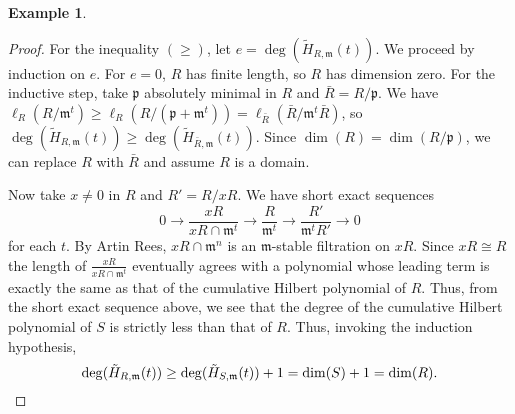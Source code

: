 \documentclass{amsart}[12pt]
\newcommand{\p}{{\mathfrak p}}
\newcommand{\m}{{\mathfrak m}}
\numberwithin{equation}{section}
\theoremstyle{plain} %
\theoremstyle{definition}
\newtheorem{definition}[equation]{Definition}
\newtheorem{ex}[equation]{Example}
\theoremstyle{remark}
\begin{document}
\begin{ex}
\begin{proof}
For the inequality $(\geq)$, let $e=\deg(\tilde{H}_{R,\m}(t))$. We proceed by induction on $e$. For $e=0$, $R$ has finite length, so $R$ has dimension zero. For the inductive step, take $\p$ absolutely minimal in $R$ and $\bar{R}=R/\p$. We have $\ell_R(R/\m^t) \geq \ell_R(R/(\p+\m^t))=\ell_{\bar{R}}(\bar{R}/\m^t \bar{R})$, so $\deg(\tilde{H}_{R,\m}(t)) \geq \deg(\tilde{H}_{\bar{R},\m}(t))$. Since $\dim(R)=\dim(R/\p)$, we can replace $R$ with $\bar{R}$ and assume $R$ is a domain.

Now take $x\neq 0$ in $R$ and $R'=R/xR$. We have short exact sequences
\[ 0 \to \frac{xR}{xR \cap \m^t} \to \frac{R}{\m^t } \to \frac{R'}{\m^t R'} \to  0\]
for each $t$. By Artin Rees, $xR \cap \m^n$ is an $\m$-stable filtration on $xR$. Since $xR\cong R$ the length of $\displaystyle \frac{xR}{xR \cap \m^t}$ eventually agrees with a polynomial whose leading term is exactly the same as that of the cumulative Hilbert polynomial of $R$. Thus, from the short exact sequence above, we see that the degree of the cumulative Hilbert polynomial of $S$ is strictly less than that of $R$. Thus, invoking the induction hypothesis,
\[  \deg(\tilde{H}_{R,\m}(t)) \geq \deg(\tilde{H}_{S,\m}(t)) +1 = \dim(S) +1 = \dim(R).\qedhere\]
\end{proof}

\begin{comment}
 
 \section{Classes of rings}


\subsection{Regular rings}

We saw that for finitely generated algebras, the dimension was bounded above by the number of generators, and equality forced our ring to be a polynomial ring. The Krull height theorem provided us a local analogue to this bound on dimension: the number of generators of the maximal ideal. One might expect that the rings for which equality holds might be good like polynomial rings.

\begin{definition}[Regular ring]
	A Noetherian local ring $(R,\m,k)$ is \emph{regular}\index{regular} if $\dim(R)=\dim_k(\m/\m^2)$. More generally, a Noetherian ring is regular if $R_\m$ is regular for every maximal ideal $\m$.
	\end{definition}



\end{comment}
\end{ex}
\end{document}
